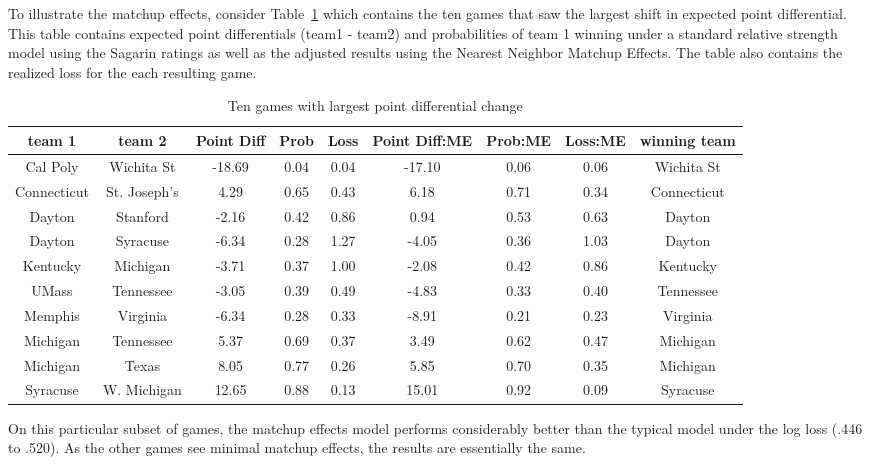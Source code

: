 To illustrate the matchup effects, consider Table~\ref{tab:change} which contains the ten games that saw the largest shift in expected point differential.  This table contains expected point differentials (team1 - team2) and probabilities of team 1 winning under a standard relative strength model using the Sagarin ratings as well as the adjusted results using the Nearest Neighbor Matchup Effects.  The table also contains the realized loss for the each resulting game.
\begin{table}[ht]
\caption{Ten games with largest point differential change}
\footnotesize
\centering
\begin{tabular}{|cc | ccc | ccc | c|}
  \hline
  \hline
 team 1 & team 2 & Point Diff & Prob & Loss & Point Diff:ME & Prob:ME & Loss:ME & winning team \\ 
  \hline
 Cal Poly & Wichita St & -18.69 & 0.04 & 0.04 & -17.10 & 0.06 & 0.06 & Wichita St \\ 
 Connecticut & St. Joseph's &4.29 & 0.65 & 0.43 & 6.18 & 0.71 & 0.34 & Connecticut \\ 
 Dayton & Stanford & -2.16 & 0.42 & 0.86 & 0.94 & 0.53 & 0.63 & Dayton \\ 
 Dayton & Syracuse & -6.34 & 0.28 & 1.27 & -4.05 & 0.36 & 1.03 & Dayton \\ 
 Kentucky & Michigan & -3.71 & 0.37 & 1.00 & -2.08 & 0.42 & 0.86 & Kentucky \\ 
 UMass & Tennessee &-3.05 & 0.39 & 0.49 & -4.83 & 0.33 & 0.40 & Tennessee \\ 
 Memphis & Virginia & -6.34 & 0.28 & 0.33 & -8.91 & 0.21 & 0.23 & Virginia  \\ 
 Michigan & Tennessee & 5.37 & 0.69 & 0.37 & 3.49 & 0.62 & 0.47 & Michigan\\ 
 Michigan & Texas & 8.05 & 0.77 & 0.26 & 5.85 & 0.70 & 0.35 & Michigan \\ 
 Syracuse & W. Michigan & 12.65 & 0.88 & 0.13 & 15.01 & 0.92 & 0.09 & Syracuse \\ 
   \hline
   \hline
\end{tabular}
\label{tab:change}
\end{table}
On this particular subset of games, the matchup effects model performs considerably better than the typical model under the log loss (.446 to .520).  As the other games see minimal matchup effects, the results are essentially the same.  